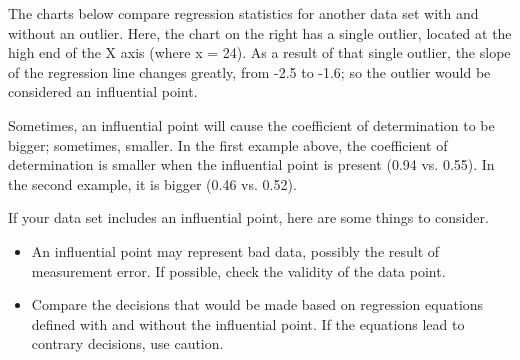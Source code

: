 \documentclass[residuals.tex]{subfiles}
\begin{document}
	The charts below compare regression statistics for another data set with and without an outlier. Here, the chart on the right has a single outlier, located at the high end of the X axis (where x = 24). As a result of that single outlier, the slope of the regression line changes greatly, from -2.5 to -1.6; so the outlier would be considered an influential point.
	
	
	
	
	
	Sometimes, an influential point will cause the coefficient of determination to be bigger; sometimes, smaller. In the first example above, the coefficient of determination is smaller when the influential point is present (0.94 vs. 0.55). In the second example, it is bigger (0.46 vs. 0.52).
	
	If your data set includes an influential point, here are some things to consider.
	
	
	\begin{itemize}
		\item An influential point may represent bad data, possibly the result of measurement error. If possible, check the validity of the data point.
		
		\item Compare the decisions that would be made based on regression equations defined with and without the influential point. If the equations lead to contrary decisions, use caution.
		
	\end{itemize}
\end{document}
